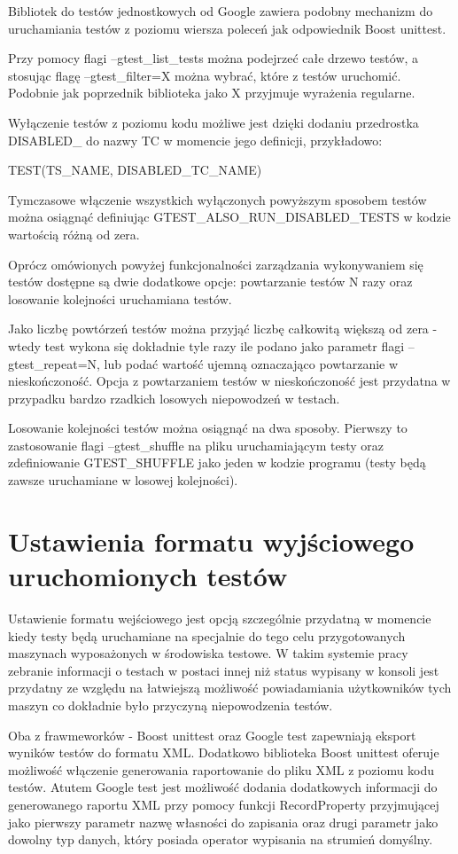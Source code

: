 \documentclass[12pt,a4paper,notitlepage]{report}
\begin{document}
Bibliotek do testów jednostkowych od Google zawiera podobny mechanizm do uruchamiania testów z poziomu wiersza poleceń jak odpowiednik Boost unittest.

Przy pomocy flagi --gtest{\_}list{\_}tests można podejrzeć całe drzewo testów, a stosując flagę --gtest{\_}filter=X można wybrać, które z testów uruchomić. Podobnie jak poprzednik biblioteka jako X przyjmuje wyrażenia regularne.

Wyłączenie testów z poziomu kodu możliwe jest dzięki dodaniu przedrostka DISABLED{\_} do nazwy TC w momencie jego definicji, przykładowo:

TEST(TS{\_}NAME, DISABLED{\_}TC{\_}NAME)

Tymczasowe włączenie wszystkich wyłączonych powyższym sposobem testów można osiągnąć definiując GTEST{\_}ALSO{\_}RUN{\_}DISABLED{\_}TESTS w kodzie wartością różną od zera.

Oprócz omówionych powyżej funkcjonalności zarządzania wykonywaniem się testów dostępne są dwie dodatkowe opcje: powtarzanie testów N razy oraz losowanie kolejności uruchamiana testów.

Jako liczbę powtórzeń testów można przyjąć liczbę całkowitą większą od zera - wtedy test wykona się dokładnie tyle razy ile podano jako parametr flagi --gtest{\_}repeat=N, lub podać wartość ujemną oznaczająco powtarzanie w nieskończoność. Opcja z powtarzaniem testów w nieskończoność jest przydatna w przypadku bardzo rzadkich losowych niepowodzeń w testach.

Losowanie kolejności testów można osiągnąć na dwa sposoby. Pierwszy to zastosowanie flagi --gtest{\_}shuffle na pliku uruchamiającym testy oraz zdefiniowanie GTEST{\_}SHUFFLE jako jeden w kodzie programu (testy będą zawsze uruchamiane w losowej kolejności).

\chapter{Ustawienia formatu wyjściowego uruchomionych testów}

Ustawienie formatu wejściowego jest opcją szczególnie przydatną w momencie kiedy testy będą uruchamiane na specjalnie do tego celu przygotowanych maszynach wyposażonych w środowiska testowe. W takim systemie pracy zebranie informacji o testach w postaci innej niż status wypisany w konsoli jest przydatny ze względu na łatwiejszą możliwość powiadamiania użytkowników tych maszyn co dokładnie było przyczyną niepowodzenia testów.

Oba z frawmeworków - Boost unittest oraz Google test zapewniają eksport wyników testów do formatu XML. Dodatkowo biblioteka Boost unittest oferuje możliwość włączenie generowania raportowanie do pliku XML z poziomu kodu testów. Atutem Google test jest możliwość dodania dodatkowych informacji do generowanego raportu XML przy pomocy funkcji 	RecordProperty przyjmującej jako pierwszy parametr nazwę własności do zapisania oraz drugi parametr jako dowolny typ danych, który posiada operator wypisania na strumień domyślny.
\end{document}
